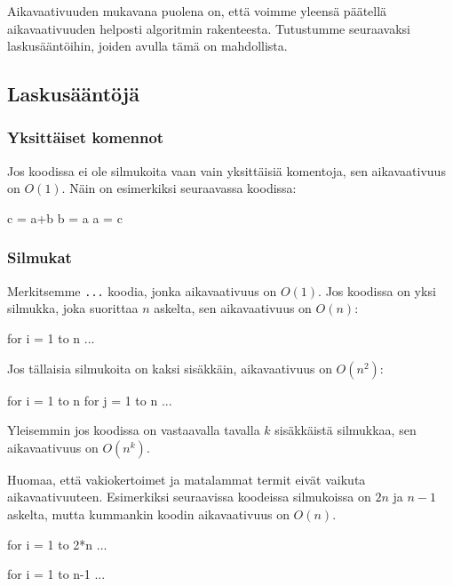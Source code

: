 Aikavaativuuden mukavana puolena on, että voimme yleensä
päätellä aikavaativuuden helposti algoritmin
rakenteesta. Tutustumme seuraavaksi laskusääntöihin,
joiden avulla tämä on mahdollista.

\subsection{Laskusääntöjä}

\subsubsection{Yksittäiset komennot}

Jos koodissa ei ole silmukoita vaan vain
yksittäisiä komentoja, sen aikavaativuus on $O(1)$.
Näin on esimerkiksi seuraavassa koodissa:

\begin{code}
c = a+b
b = a
a = c
\end{code}

\subsubsection{Silmukat}

Merkitsemme \texttt{...} koodia,
jonka aikavaativuus on $O(1)$.
Jos koodissa on yksi silmukka,
joka suorittaa $n$ askelta,
sen aikavaativuus on $O(n)$:

\begin{code}
for i = 1 to n
    ...
\end{code}

Jos tällaisia silmukoita on kaksi sisäkkäin,
aikavaativuus on $O(n^2)$:

\begin{code}
for i = 1 to n
    for j = 1 to n
        ...
\end{code}

Yleisemmin jos koodissa on vastaavalla tavalla
$k$ sisäkkäistä silmukkaa, sen aikavaativuus on $O(n^k)$.

Huomaa, että vakiokertoimet ja matalammat termit eivät vaikuta aikavaativuuteen.
Esimerkiksi seuraavissa koodeissa silmukoissa on $2n$ ja $n-1$ askelta,
mutta kummankin koodin aikavaativuus on $O(n)$.

\begin{code}
for i = 1 to 2*n
    ...
\end{code}

\begin{code}
for i = 1 to n-1
    ...
\end{code}

